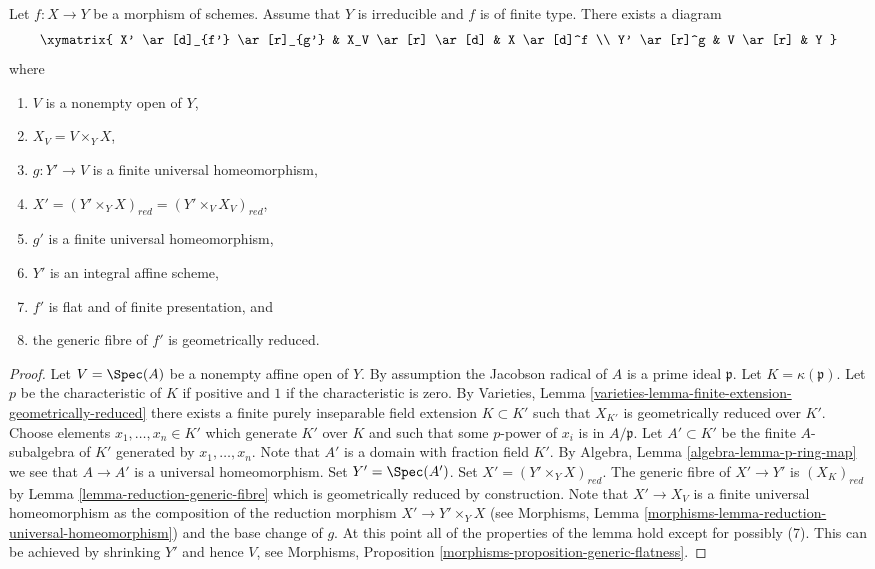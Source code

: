 \begin{lemma}
\label{lemma-make-generic-fibre-geometrically-reduced}
Let $f : X \to Y$ be a morphism of schemes.
Assume that $Y$ is irreducible and $f$ is of finite type.
There exists a diagram
$$
\xymatrix{
X' \ar[d]_{f'} \ar[r]_{g'} & X_V \ar[r] \ar[d] & X \ar[d]^f \\
Y' \ar[r]^g & V \ar[r] & Y
}
$$
where
\begin{enumerate}
\item $V$ is a nonempty open of $Y$,
\item $X_V = V \times_Y X$,
\item $g : Y' \to V$ is a finite universal homeomorphism,
\item $X' = (Y' \times_Y X)_{red} = (Y' \times_V X_V)_{red}$,
\item $g'$ is a finite universal homeomorphism,
\item $Y'$ is an integral affine scheme,
\item $f'$ is flat and of finite presentation, and
\item the generic fibre of $f'$ is geometrically reduced.
\end{enumerate}
\end{lemma}

\begin{proof}
Let $V = \Spec(A)$ be a nonempty affine open of $Y$.
By assumption the Jacobson radical of $A$ is a prime ideal $\mathfrak p$.
Let $K = \kappa(\mathfrak p)$.
Let $p$ be the characteristic of $K$ if positive and $1$
if the characteristic is zero. By
Varieties, Lemma \ref{varieties-lemma-finite-extension-geometrically-reduced}
there exists a finite purely inseparable field extension
$K \subset K'$ such that $X_{K'}$ is geometrically reduced over $K'$.
Choose elements $x_1, \ldots, x_n \in K'$ which generate $K'$ over
$K$ and such that some $p$-power of $x_i$ is in $A/\mathfrak p$.
Let $A' \subset K'$ be the finite $A$-subalgebra of $K'$ generated by
$x_1, \ldots, x_n$. Note that $A'$ is a domain with fraction field $K'$. By
Algebra, Lemma \ref{algebra-lemma-p-ring-map}
we see that $A \to A'$ is a universal homeomorphism.
Set $Y' = \Spec(A')$. Set $X' = (Y' \times_Y X)_{red}$.
The generic fibre of $X' \to Y'$ is $(X_K)_{red}$ by
Lemma \ref{lemma-reduction-generic-fibre}
which is geometrically reduced by construction.
Note that $X' \to X_V$ is a finite universal homeomorphism as the
composition of the reduction morphism $X' \to Y' \times_Y X$ (see
Morphisms, Lemma \ref{morphisms-lemma-reduction-universal-homeomorphism})
and the base change of $g$.
At this point all of the properties of the lemma hold except for
possibly (7). This can be achieved by shrinking $Y'$ and hence $V$, see
Morphisms, Proposition \ref{morphisms-proposition-generic-flatness}.
\end{proof}

